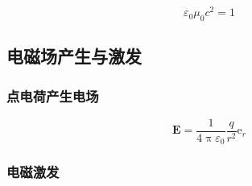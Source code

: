 \documentclass[UTF8,fontset=fandol,zihao=5]{ctexart}
\newcommand{\ee}{\mathrm{e}}
\newcommand{\vect}[1]{\bm{#1}}
\begin{document}
\noindent\begin{methodbox}[真空介电常数与真空磁导率关系]
  \[\varepsilon_0\mu_0 c^2=1\]
\end{methodbox}

\subsection{电磁场产生与激发}

\subsubsection{点电荷产生电场}

\[
\vect{E} = \frac{1}{4\uppi\varepsilon_0}\frac{q}{r^2} \vect \ee_r
\]

\subsubsection{电磁激发}
\end{document}
